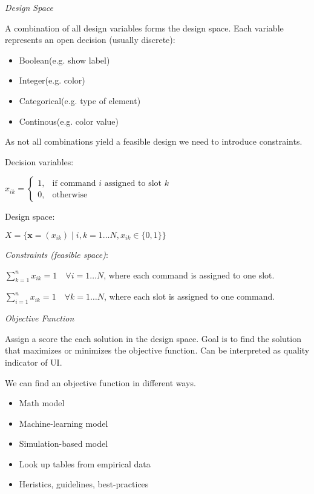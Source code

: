 \textit{Design Space} \smallskip

A combination of all design variables forms the design space. Each variable represents an open decision (usually discrete):

\begin{itemize}[itemsep=-5pt, topsep=0pt, leftmargin=*]
	\item Boolean(e.g. show label)
	\item Integer(e.g. color)
	\item Categorical(e.g. type of element)
	\item Continous(e.g. color value)
\end{itemize}

As not all combinations yield a feasible design we need to introduce constraints. \smallskip

Decision variables: \smallskip

$x_{ik} = 
\begin{cases} 
1, & \text{if command } i \text{ assigned to slot } k \\
0, & \text{otherwise}
\end{cases}$

Design space: \smallskip

$X = \{ \mathbf{x} = (x_{ik}) \mid i,k = 1 \ldots N, x_{ik} \in \{0,1\} \}$ \medskip

\textit{Constraints (feasible space)}: \medskip

$\sum_{k=1}^{n} x_{ik} = 1 \quad \forall i = 1 \ldots N$, where each command is assigned to one slot. 


$\sum_{i=1}^{n} x_{ik} = 1 \quad \forall k = 1 \ldots N$, where each slot is assigned to one command.\medskip

\textit{Objective Function} \medskip

Assign a score the each solution in the design space. Goal is to find the solution that maximizes or minimizes the objective function.
Can be interpreted as quality indicator of UI. \smallskip

We can find an objective function in different ways.

\begin{itemize}[itemsep=-5pt, topsep=0pt, leftmargin=*]
	\item Math model
	\item Machine-learning model
	\item Simulation-based model
	\item Look up tables from empirical data
	\item Heristics, guidelines, best-practices
\end{itemize}

